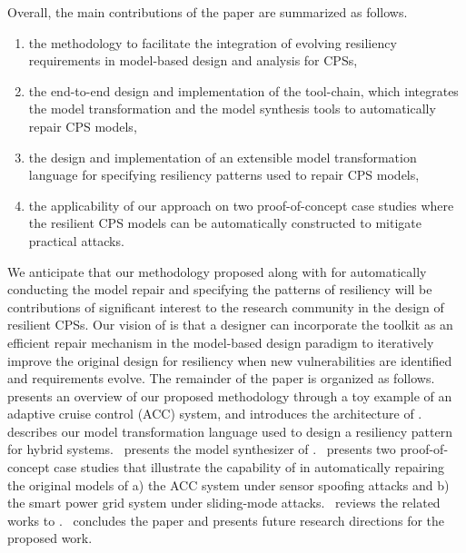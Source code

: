 
Overall, the main contributions of the paper are summarized as follows.
%
\begin{enumerate}[leftmargin= 2 em]
\item the methodology to facilitate the integration of evolving resiliency requirements in model-based design and analysis for CPSs,
\item the end-to-end design and implementation of the tool-chain, which integrates the model transformation and the model synthesis tools to automatically repair CPS models,
\item the design and implementation of an extensible model transformation language for specifying resiliency patterns used to repair CPS models,
\item the applicability of our approach on two proof-of-concept case studies where the resilient CPS models can be automatically constructed to mitigate practical attacks.
\end{enumerate}
%
%
We anticipate that our methodology proposed along with \toolreaffirm for automatically conducting the model repair and specifying the patterns of resiliency will be contributions of significant interest to the research community in the design of resilient CPSs. Our vision of \toolreaffirm is that a designer can incorporate the toolkit as an efficient repair mechanism in the model-based design paradigm to iteratively improve the original design for resiliency when new vulnerabilities are identified and requirements evolve.
%
%
The remainder of the paper is organized as follows.~ presents an overview of our proposed methodology through  a toy example of an adaptive cruise control (ACC) system, and introduces the architecture of \toolreaffirm.~ describes our model transformation language used to design a resiliency pattern for hybrid systems.~ presents the model synthesizer of \toolreaffirm.~ presents two proof-of-concept case studies that illustrate the capability of \toolreaffirm in automatically repairing the original models of a) the ACC system under sensor spoofing attacks and b) the smart power grid system under sliding-mode attacks.~ reviews the related works to \toolreaffirm.~ concludes the paper and presents future research directions for the proposed work.






